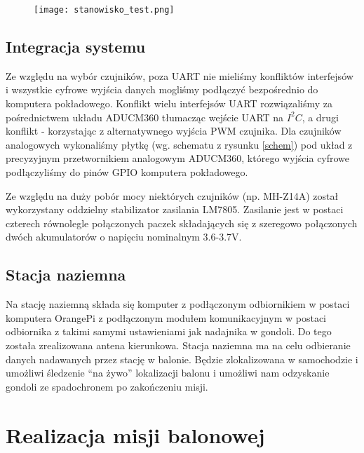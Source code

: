 \documentclass[a4paper,12pt]{article}
\begin{document}
\begin{figure}[H]
\centering
\texttt{[image: stanowisko\_test.png]}
\end{figure}


\subsection{Integracja systemu}

Ze względu na wybór czujników, poza UART nie mieliśmy konfliktów interfejsów i wszystkie cyfrowe wyjścia danych mogliśmy podłączyć bezpośrednio do komputera pokładowego. Konflikt wielu interfejsów UART rozwiązaliśmy za pośrednictwem układu ADUCM360 tłumacząc wejście UART na $I^2C$, a drugi konflikt - korzystając z alternatywnego wyjścia PWM czujnika. Dla czujników analogowych wykonaliśmy płytkę (wg. schematu z rysunku \ref{schem}) pod układ z precyzyjnym przetwornikiem analogowym ADUCM360, którego wyjścia cyfrowe podłączyliśmy do pinów GPIO komputera pokładowego.

Ze względu na duży pobór mocy niektórych czujników (np. MH-Z14A) został wykorzystany oddzielny stabilizator zasilania LM7805.
Zasilanie jest w postaci czterech równolegle połączonych paczek składających się z szeregowo połączonych dwóch akumulatorów o napięciu nominalnym 3.6-3.7V.

\subsection{Stacja naziemna}

Na stację naziemną składa się komputer z podłączonym odbiornikiem w postaci komputera OrangePi z podłączonym modułem komunikacyjnym w postaci odbiornika z takimi samymi ustawieniami jak nadajnika w gondoli. Do tego została zrealizowana antena kierunkowa. Stacja naziemna ma na celu odbieranie danych nadawanych przez stację w balonie. Będzie zlokalizowana w samochodzie i umożliwi śledzenie ``na żywo'' lokalizacji balonu i umożliwi nam odzyskanie gondoli ze spadochronem po zakończeniu misji.

\section{Realizacja misji balonowej}
\end{document}

